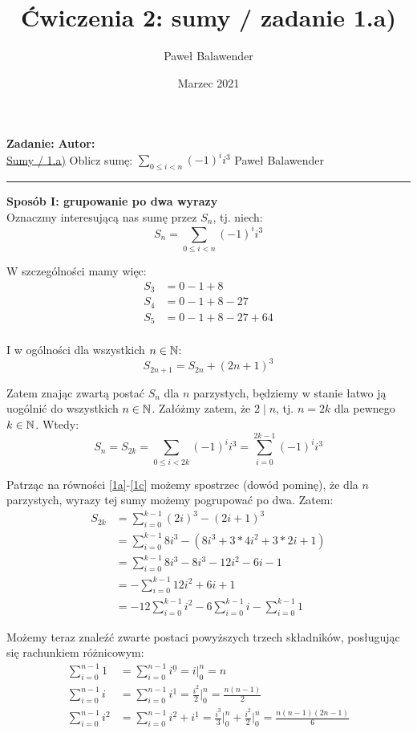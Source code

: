 \documentclass{article}
\title{Ćwiczenia 2: sumy / zadanie 1.a)}
\author{Paweł Balawender}
\date{Marzec 2021}
\def\N{\ensuremath\mathbb{N}}
\newcommand{\desc}[2]{#1^{\underline{#2}}}
\newcommand{\evalat}[3]{#1 \big | _#2^#3}
\begin{document}
\textbf{Zadanie:} \hfill \textbf{Autor:} \\ 
\href{http://smurf.mimuw.edu.pl/node/1013}{Sumy / 1.a)} Oblicz sumę: $\sum_{0 \leq i < n}(-1)^ii^3$ \hfill Paweł Balawender \\ 
\rule{\textwidth}{1pt}
\bigskip

\textbf{Sposób I: grupowanie po dwa wyrazy} \\ Oznaczmy interesującą nas sumę przez $S_n$, tj. niech:
\[S_n = \sum_{0 \leq i < n}(-1)^i i^3\]

W szczególności mamy więc:
\begin{align*}
S_3 &= 0 - 1 + 8 \tag{1a}\label{1a} \\
S_4 &= 0 - 1 + 8 - 27 \tag{1b}\label{1b} \\
S_5 &= 0 - 1 + 8 - 27 + 64 \tag{1c}\label{1c} \\
\end{align*}

I w ogólności dla wszystkich $n \in \N$:
\[S_{2n+1} = S_{2n} + (2n+1)^3\]

Zatem znając zwartą postać $S_n$ dla $n$ parzystych, będziemy w stanie łatwo ją uogólnić do wszystkich $n \in \N$. Załóżmy zatem, że $2 \mid n$, tj. $n = 2k$ dla pewnego $k \in \N$. Wtedy:
\[S_n = S_{2k} = \sum_{0 \leq i < 2k}(-1)^i i^3 = \sum_{i=0}^{2k-1}(-1)^i i^3\]

Patrząc na równości \ref{1a}-\ref{1c} możemy spostrzec (dowód pominę), że dla $n$ parzystych, wyrazy tej sumy możemy pogrupować po dwa. Zatem:
\begin{align*}
S_{2k} &= \sum_{i=0}^{k-1} (2i)^3 - (2i+1)^3 \\
&=\sum_{i=0}^{k-1} 8i^3 - (8i^3 + 3*4i^2 + 3*2i + 1) \\
&=\sum_{i=0}^{k-1} 8i^3 - 8i^3 - 12i^2 - 6i - 1 \\
&=- \sum_{i=0}^{k-1} 12i^2 + 6i + 1 \\
&=-12\sum_{i=0}^{k-1}i^2 -6\sum_{i=0}^{k-1}i -\sum_{i=0}^{k-1}1
\end{align*}

Możemy teraz znaleźć zwarte postaci powyższych trzech składników, posługując się rachunkiem różnicowym:
\begin{align*}
\sum_{i=0}^{n-1}1
&= \sum_{i=0}^{n-1} \desc{i}{0}
= \evalat{i}{0}{n}
= n \\
\sum_{i=0}^{n-1}i
&= \sum_{i=0}^{n-1} \desc{i}{1} 
= \frac{\desc{i}{2}}{2}\big|_0^n 
= \frac{n(n-1)}{2} \\
\sum_{i=0}^{n-1}i^2 
&= \sum_{i=0}^{n-1}\desc{i}{2} + \desc{i}{1} 
= \evalat{\frac{\desc{i}{3}}{3}}{0}{n} +  \evalat{\frac{\desc{i}{2}}{2}}{0}{n} 
= \frac{n(n-1)(2n-1)}{6} \\
\end{align*}
\end{document}
